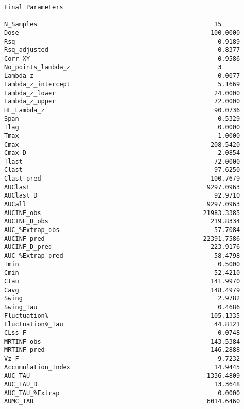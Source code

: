 \documentclass[12pt,a4paper]{article}
\begin{document}
\begin{verbatim}
Final Parameters
---------------
N_Samples                                                15
Dose                                                    100.0000
Rsq                                                       0.9189
Rsq_adjusted                                              0.8377
Corr_XY                                                  -0.9586
No_points_lambda_z                                        3
Lambda_z                                                  0.0077
Lambda_z_intercept                                        5.1669
Lambda_z_lower                                           24.0000
Lambda_z_upper                                           72.0000
HL_Lambda_z                                              90.0736
Span                                                      0.5329
Tlag                                                      0.0000
Tmax                                                      1.0000
Cmax                                                    208.5420
Cmax_D                                                    2.0854
Tlast                                                    72.0000
Clast                                                    97.6250
Clast_pred                                              100.7679
AUClast                                                9297.0963
AUClast_D                                                92.9710
AUCall                                                 9297.0963
AUCINF_obs                                            21983.3385
AUCINF_D_obs                                            219.8334
AUC_%Extrap_obs                                          57.7084
AUCINF_pred                                           22391.7586
AUCINF_D_pred                                           223.9176
AUC_%Extrap_pred                                         58.4798
Tmin                                                      0.5000
Cmin                                                     52.4210
Ctau                                                    141.9970
Cavg                                                    148.4979
Swing                                                     2.9782
Swing_Tau                                                 0.4686
Fluctuation%                                            105.1335
Fluctuation%_Tau                                         44.8121
CLss_F                                                    0.0748
MRTINF_obs                                              143.5384
MRTINF_pred                                             146.2888
Vz_F                                                      9.7232
Accumulation_Index                                       14.9445
AUC_TAU                                                1336.4809
AUC_TAU_D                                                13.3648
AUC_TAU_%Extrap                                           0.0000
AUMC_TAU                                               6014.6460




\end{verbatim}
\end{document}
